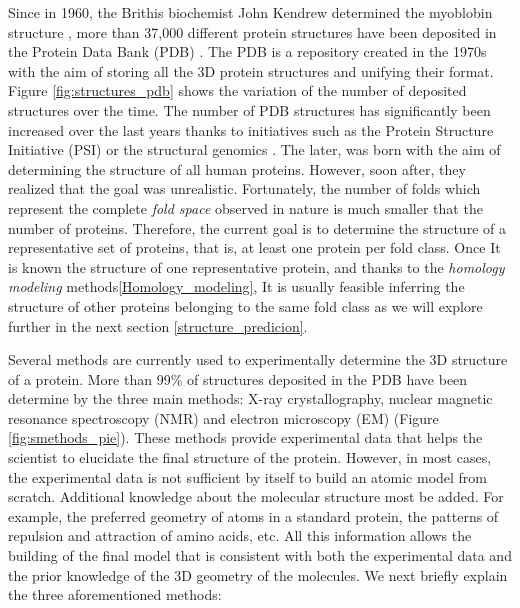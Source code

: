 \documentclass[12pt, a4paper,twoside]{tesi_upf}
\begin{document}
\par Since in 1960, the Brithis biochemist John Kendrew determined the myoblobin structure \cite{KENDREW1960}, more than 37,000 different protein structures have been deposited in the Protein Data Bank (PDB) \cite{Berman2000}. The PDB is a repository created in the 1970s with the aim of storing all the 3D protein structures and unifying their format. Figure \ref{fig:structures_pdb} shows the variation of the number of deposited structures over the time. The number of PDB structures has significantly been increased over the last years thanks to initiatives such as the Protein Structure Initiative (PSI) \cite{Norvell2007} or the structural genomics \cite{GIleadi2007}. The later, was born with the aim of determining the structure of all human proteins. However, soon after, they realized that the goal was unrealistic. Fortunately, the number of folds which represent the complete \textit{fold space} observed in nature is much smaller that the number of proteins. Therefore, the current goal is to determine the structure of a representative set of proteins, that is, at least one protein per fold class. Once It is known the structure of one representative protein, and thanks to the \textit{homology modeling} methods\ref{Homology_modeling}, It is usually feasible inferring the structure of other proteins belonging to the same fold class as  we will explore further in the next section \ref{structure_predicion}.
\par Several methods are currently used to experimentally determine the 3D structure of a protein. More than 99$\%$ of structures deposited in the PDB have been determine by the three main methods:  X-ray crystallography, nuclear magnetic resonance  spectroscopy (NMR) and electron microscopy (EM) (Figure \ref{fig:smethods_pie}). These methods provide experimental data that helps the scientist to elucidate the final structure of the protein. However, in most cases, the experimental data is not sufficient by itself to build an atomic model from scratch. Additional knowledge about the molecular structure most be added. For example, the preferred geometry of atoms in a standard protein, the patterns of repulsion and attraction of amino acids, etc. All this information allows the building of the final model that is consistent with both the experimental data and the prior knowledge of the 3D geometry of the molecules. We next briefly explain the three aforementioned methods:
\end{document}
